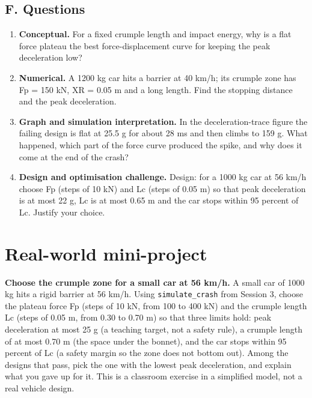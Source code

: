 \documentclass[11pt,a4paper]{article}
\begin{document}
\subsection*{F. Questions}
\begin{enumerate}[nosep]
\item \textbf{Conceptual.} For a fixed crumple length and impact energy, why is a flat force plateau the best force-displacement curve for keeping the peak deceleration low?
\item \textbf{Numerical.} A 1200 kg car hits a barrier at 40 km/h; its crumple zone has Fp = 150 kN, XR = 0.05 m and a long length. Find the stopping distance and the peak deceleration.
\item \textbf{Graph and simulation interpretation.} In the deceleration-trace figure the failing design is flat at 25.5 g for about 28 ms and then climbs to 159 g. What happened, which part of the force curve produced the spike, and why does it come at the end of the crash?
\item \textbf{Design and optimisation challenge.} Design: for a 1000 kg car at 56 km/h choose Fp (steps of 10 kN) and Lc (steps of 0.05 m) so that peak deceleration is at most 22 g, Lc is at most 0.65 m and the car stops within 95 percent of Lc. Justify your choice.
\end{enumerate}

\section{Real-world mini-project}
\textbf{Choose the crumple zone for a small car at 56 km/h.} A small car of 1000 kg hits a rigid barrier at 56 km/h. Using \texttt{simulate\_crash} from Session 3, choose the plateau force Fp (steps of 10 kN, from 100 to 400 kN) and the crumple length Lc (steps of 0.05 m, from 0.30 to 0.70 m) so that three limits hold: peak deceleration at most 25 g (a teaching target, not a safety rule), a crumple length of at most 0.70 m (the space under the bonnet), and the car stops within 95 percent of Lc (a safety margin so the zone does not bottom out). Among the designs that pass, pick the one with the lowest peak deceleration, and explain what you gave up for it. This is a classroom exercise in a simplified model, not a real vehicle design.
\end{document}
